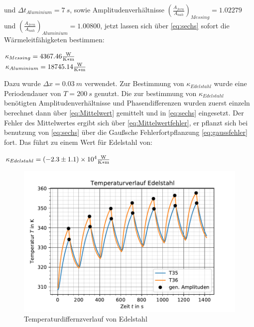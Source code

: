   und $\Delta t_{Aluminium}=\SI[]{7}[]{s}$, sowie Amplitudenverhältnisse $(\frac{A_{fern}}{A_{nah}})_{Messing}=1.02279$ und $(\frac{A_{fern}}{A_{nah}})_{Aluminium}=1.00800$,
  jetzt lassen sich über \autoref{eq:sechs} sofort die Wärmeleitfähigketen bestimmen:
  \begin{center}
      $\kappa_{Messing}=4367.46\si[]{\frac{W}{K*m}}$\\
      $\kappa_{Aluminium}=18745.14\si[]{\frac{W}{K*m}}$
  \end{center}
  Dazu wurde $\Delta x=\SI[]{0.03}[]{m}$ verwendet.
  Zur Bestimmung von $\kappa_{Edelstahl}$ wurde eine Periodendauer von $T=\SI[]{200}[]{s}$ genutzt.
  Die zur bestimmung von $\kappa_{Edelstahl}$ benötigten Amplitudenverhältnisse und Phasendifferenzen
  wurden zuerst einzeln berechnet dann über \autoref{eq:Mittelwert} gemittelt und in \autoref{eq:sechs}
  eingesetzt. Der Fehler des Mittelwertes ergibt sich über \autoref{eq:Mittelwertfehler}, er pflanzt sich bei benutzung
  von \autoref{eq:sechs} über die Gaußsche Fehlerfortpflanzung \autoref{eq:gaussfehler} fort. 
  Das führt zu einem Wert für Edelstahl von:
  \begin{center}
      $\kappa_{Edelstahl}=(-2.3\pm 1.1)\times 10^{4}\si[]{\frac{W}{K*m}}$
  \end{center}
  \begin{figure}
    \centering
    \includegraphics{welleedelstahl.pdf}
    \caption{Temperaturdiffernzverlauf von Edelstahl}
    \label{fig:differenz}
  \end{figure}

